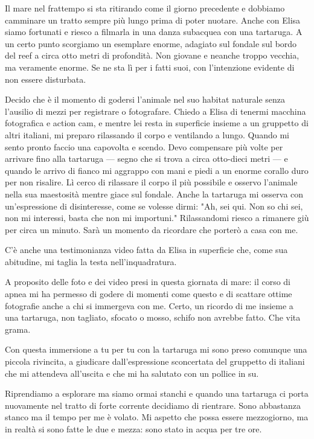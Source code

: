 Il mare nel frattempo si sta ritirando come il giorno precedente e dobbiamo camminare un tratto sempre più lungo prima di poter nuotare. Anche con Elisa siamo fortunati e riesco a filmarla in una danza subacquea con una tartaruga. A un certo punto scorgiamo un esemplare enorme, adagiato sul fondale sul bordo del reef a circa otto metri di profondità. Non giovane e neanche troppo vecchia, ma veramente enorme. Se ne sta lì per i fatti suoi, con l'intenzione evidente di non essere disturbata.

Decido che è il momento di godersi l'animale nel suo habitat naturale senza l'ausilio di mezzi per registrare o fotografare. Chiedo a Elisa di tenermi macchina fotografica e action cam, e mentre lei resta in superficie insieme a un gruppetto di altri italiani, mi preparo rilassando il corpo e ventilando a lungo. Quando mi sento pronto faccio una capovolta e scendo. Devo compensare più volte per arrivare fino alla tartaruga — segno che si trova a circa otto-dieci metri — e quando le arrivo di fianco mi aggrappo con mani e piedi a un enorme corallo duro per non risalire. Lì cerco di rilassare il corpo il più possibile e osservo l'animale nella sua maestosità mentre giace sul fondale. Anche la tartaruga mi osserva con un'espressione di disinteresse, come se volesse dirmi: "Ah, sei qui. Non so chi sei, non mi interessi, basta che non mi importuni." Rilassandomi riesco a rimanere giù per circa un minuto. Sarà un momento da ricordare che porterò a casa con me.

C'è anche una testimonianza video fatta da Elisa in superficie che, come sua abitudine, mi taglia la testa nell'inquadratura.

A proposito delle foto e dei video presi in questa giornata di mare: il corso di apnea mi ha permesso di godere di momenti come questo e di scattare ottime fotografie anche a chi si immergeva con me. Certo, un ricordo di me insieme a una tartaruga, non tagliato, sfocato o mosso, schifo non avrebbe fatto. Che vita grama.

Con questa immersione a tu per tu con la tartaruga mi sono preso comunque una piccola rivincita, a giudicare dall'espressione sconcertata del gruppetto di italiani che mi attendeva all'uscita e che mi ha salutato con un pollice in su.

Riprendiamo a esplorare ma siamo ormai stanchi e quando una tartaruga ci porta nuovamente nel tratto di forte corrente decidiamo di rientrare. Sono abbastanza stanco ma il tempo per me è volato. Mi aspetto che possa essere mezzogiorno, ma in realtà si sono fatte le due e mezza: sono stato in acqua per tre ore.

